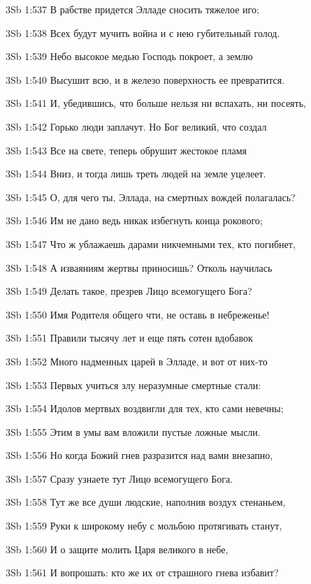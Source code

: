 \vs 3Sb 1:537 В рабстве придется Элладе сносить тяжелое иго; 

\vs 3Sb 1:538 Всех будут мучить война и с нею губительный голод. 

\vs 3Sb 1:539 Небо высокое медью Господь покроет, а землю

\vs 3Sb 1:540 Высушит всю, и в железо поверхность ее превратится. 

\vs 3Sb 1:541 И, убедившись, что больше нельзя ни вспахать, ни посеять, 

\vs 3Sb 1:542 Горько люди заплачут. Но Бог великий, что создал 

\vs 3Sb 1:543 Все на свете, теперь обрушит жестокое пламя 

\vs 3Sb 1:544 Вниз, и тогда лишь треть людей на земле уцелеет.

\vs 3Sb 1:545 О, для чего ты, Эллада, на смертных вождей полагалась? 

\vs 3Sb 1:546 Им не дано ведь никак избегнуть конца рокового; 

\vs 3Sb 1:547 Что ж ублажаешь дарами никчемными тех, кто погибнет, 

\vs 3Sb 1:548 А изваяниям жертвы приносишь? Отколь научилась 

\vs 3Sb 1:549 Делать такое, презрев Лицо всемогущего Бога?

\vs 3Sb 1:550 Имя Родителя общего чти, не оставь в небреженье! 

\vs 3Sb 1:551 Правили тысячу лет и еще пять сотен вдобавок 

\vs 3Sb 1:552 Много надменных царей в Элладе, и вот от них-то 

\vs 3Sb 1:553 Первых учиться злу неразумные смертные стали: 

\vs 3Sb 1:554 Идолов мертвых воздвигли для тех, кто сами невечны;

\vs 3Sb 1:555 Этим в умы вам вложили пустые ложные мысли. 

\vs 3Sb 1:556 Но когда Божий гнев разразится над вами внезапно, 

\vs 3Sb 1:557 Сразу узнаете тут Лицо всемогущего Бога. 

\vs 3Sb 1:558 Тут же все души людские, наполнив воздух стенаньем, 

\vs 3Sb 1:559 Руки к широкому небу с мольбою протягивать станут,

\vs 3Sb 1:560 И о защите молить Царя великого в небе,

\vs 3Sb 1:561 И вопрошать: кто же их от страшного гнева избавит?

